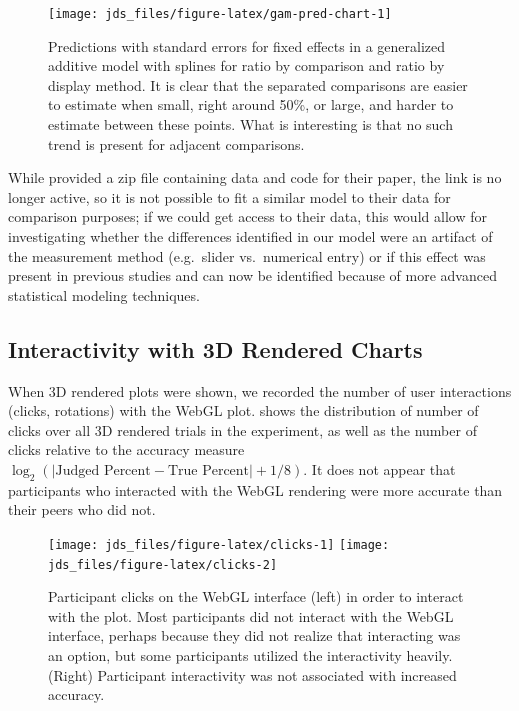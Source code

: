\documentclass[letterpaper,inpress,dvipsnames]{jdsart}
\begin{document}
\begin{figure}
\texttt{[image: jds\_files/figure-latex/gam-pred-chart-1]} \caption{Predictions with standard errors for fixed effects in a generalized additive model with splines for ratio by comparison and ratio by display method. It is clear that the separated comparisons are easier to estimate when small, right around 50\%, or large, and harder to estimate between these points. What is interesting is that no such trend is present for adjacent comparisons. }\label{fig:gam-pred-chart}
\end{figure}

While \citeauthor{heerCrowdsourcingGraphicalPerception2010b} provided a zip file containing data and code for their paper, the link is no longer active, so it is not possible to fit a similar model to their data for comparison purposes; if we could get access to their data, this would allow for investigating whether the differences identified in our model were an artifact of the measurement method (e.g.~slider vs.~numerical entry) or if this effect was present in previous studies and can now be identified because of more advanced statistical modeling techniques.

\hypertarget{interactivity-with-3d-rendered-charts}{%
\subsection{Interactivity with 3D Rendered Charts}\label{interactivity-with-3d-rendered-charts}}

When 3D rendered plots were shown, we recorded the number of user interactions (clicks, rotations) with the WebGL plot.  shows the distribution of number of clicks over all 3D rendered trials in the experiment, as well as the number of clicks relative to the accuracy measure \(\log_2(|\text{Judged Percent} - \text{True Percent}|+1/8)\). It does not appear that participants who interacted with the WebGL rendering were more accurate than their peers who did not.

\begin{figure}
\texttt{[image: jds\_files/figure-latex/clicks-1]} \texttt{[image: jds\_files/figure-latex/clicks-2]} \caption{Participant clicks on the WebGL interface (left) in order to interact with the plot. Most participants did not interact with the WebGL interface, perhaps because they did not realize that interacting was an option, but some participants utilized the interactivity heavily. (Right) Participant interactivity was not associated with increased accuracy.}\label{fig:clicks}
\end{figure}
\end{document}
